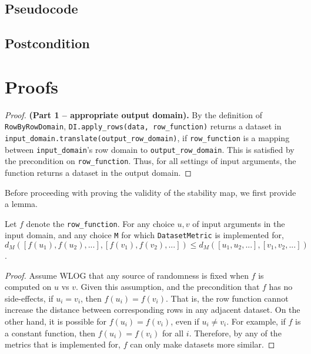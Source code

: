 \documentclass{article}
\begin{document}
\subsection*{Pseudocode}


\subsection*{Postcondition}

\section{Proofs}

\begin{proof} \textbf{(Part 1 -- appropriate output domain).}
    By the definition of \texttt{RowByRowDomain}, \texttt{DI.apply\_rows(data, row\_function)} returns a dataset in \texttt{input\_domain.translate(output\_row\_domain)},
    if \texttt{row\_function} is a mapping between \texttt{input\_domain}'s row domain to \texttt{output\_row\_domain}.
    This is satisfied by the precondition on \texttt{row\_function}.
    Thus, for all settings of input arguments, the function returns a dataset in the output domain.
\end{proof}

Before proceeding with proving the validity of the stability map, we first provide a lemma.

\begin{lemma}
    \label{f-sim}
    Let $f$ denote the \texttt{row\_function}.
    For any choice $u, v$ of input arguments in the input domain, and any choice \texttt{M} for which \texttt{DatasetMetric} is implemented for,
    $d_{M}([f(u_1), f(u_2), ...], [f(v_1), f(v_2), ...]) \le d_{M}([u_1, u_2, ...], [v_1, v_2, ...])$.
\end{lemma}

\begin{proof}
    Assume WLOG that any source of randomness is fixed when $f$ is computed on $u$ vs $v$.
    Given this assumption, and the precondition that $f$ has no side-effects,
    if $u_i = v_i$, then $f(u_i) = f(v_i)$.
    That is, the row function cannot increase the distance between corresponding rows in any adjacent dataset.
    On the other hand, it is possible for $f(u_i) = f(v_i)$, even if $u_i \neq v_i$.
    For example, if $f$ is a constant function, then $f(u_i) = f(v_i)$ for all $i$.
    Therefore, by any of the metrics that  is implemented for,
    $f$ can only make datasets more similar.
\end{proof}
\end{document}
